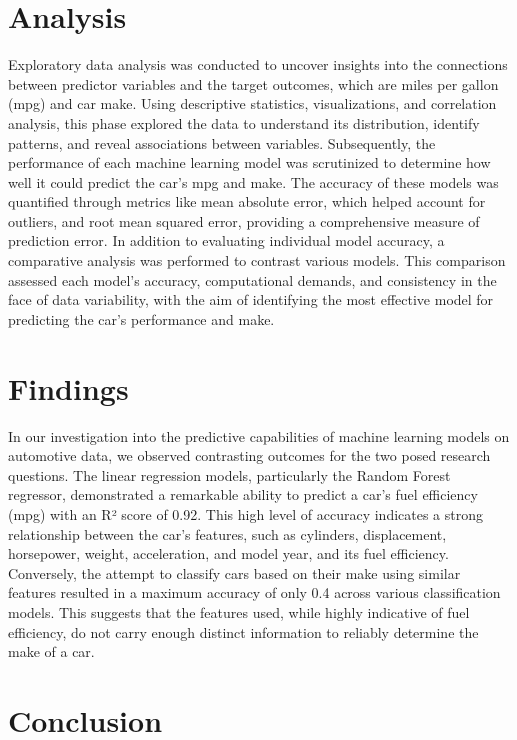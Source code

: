 \documentclass[a4paper, twocolumn]{article}
\begin{document}
\section{Analysis\label{sec:Analysis}}

Exploratory data analysis was conducted to uncover insights into the connections between predictor variables and the target outcomes, which are miles per gallon (mpg) and car make. Using descriptive statistics, visualizations, and correlation analysis, this phase explored the data to understand its distribution, identify patterns, and reveal associations between variables. Subsequently, the performance of each machine learning model was scrutinized to determine how well it could predict the car's mpg and make. The accuracy of these models was quantified through metrics like mean absolute error, which helped account for outliers, and root mean squared error, providing a comprehensive measure of prediction error. In addition to evaluating individual model accuracy, a comparative analysis was performed to contrast various models. This comparison assessed each model's accuracy, computational demands, and consistency in the face of data variability, with the aim of identifying the most effective model for predicting the car's performance and make.


\section{Findings\label{sec:Findings}}
In our investigation into the predictive capabilities of machine learning models on automotive data, we observed contrasting outcomes for the two posed research questions. The linear regression models, particularly the Random Forest regressor, demonstrated a remarkable ability to predict a car's fuel efficiency (mpg) with an R² score of 0.92. This high level of accuracy indicates a strong relationship between the car's features, such as cylinders, displacement, horsepower, weight, acceleration, and model year, and its fuel efficiency.
Conversely, the attempt to classify cars based on their make using similar features resulted in a maximum accuracy of only 0.4 across various classification models. This suggests that the features used, while highly indicative of fuel efficiency, do not carry enough distinct information to reliably determine the make of a car.


\section{Conclusion\label{sec:Conclusion}}
\end{document}

